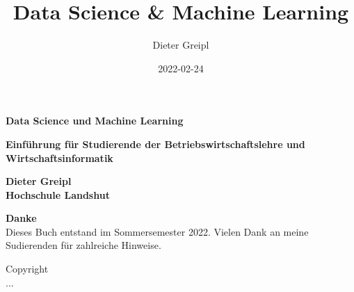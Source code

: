 \documentclass[
  oneside]{book}
\title{Data Science \& Machine Learning}
\author{Dieter Greipl}
\date{2022-02-24}
\begin{document}
\maketitle


\begin{titlepage}

\begin{center}

\Huge \textbf{Data Science und Machine Learning}

\Large \textbf{Einführung für Studierende der Betriebswirtschaftslehre und Wirtschaftsinformatik}


\end{center}

\noindent{}

\vspace{-3cm}
\hfill
\begin{minipage}[b][1cm][t]{10cm}
  \color{white}
  \begin{flushright}
     \Huge\textbf{Dieter Greipl}\\
     \Large\textbf{Hochschule Landshut}\\
  \end{flushright}
\end{minipage}

\end{titlepage}

\begin{titlepage}
\hfill
\begin{minipage}[r][10cm][t]{10cm}
\large \textbf{Danke}\\
	Dieses Buch entstand im Sommersemester 2022. Vielen Dank an meine Sudierenden für zahlreiche Hinweise.
\end{minipage}

\vfill
\begin{minipage}[b][10cm][b]{10cm}
\large{Copyright}\\
	...
\end{minipage}

\end{titlepage}
\end{document}
